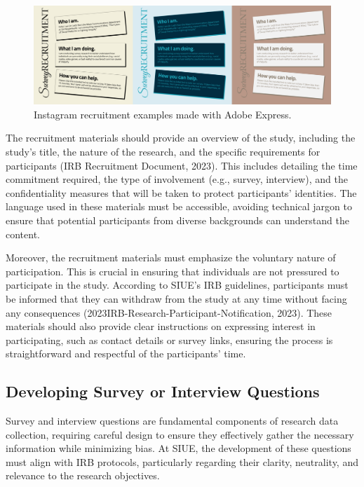 \documentclass[
]{book}
\begin{document}
\begin{figure}
\centering
\includegraphics[width=1\textwidth,height=\textheight]{images/recruit-ad.png}
\caption{Instagram recruitment examples made with Adobe Express.}
\end{figure}

The recruitment materials should provide an overview of the study, including the study's title, the nature of the research, and the specific requirements for participants (IRB Recruitment Document, 2023). This includes detailing the time commitment required, the type of involvement (e.g., survey, interview), and the confidentiality measures that will be taken to protect participants' identities. The language used in these materials must be accessible, avoiding technical jargon to ensure that potential participants from diverse backgrounds can understand the content.

Moreover, the recruitment materials must emphasize the voluntary nature of participation. This is crucial in ensuring that individuals are not pressured to participate in the study. According to SIUE's IRB guidelines, participants must be informed that they can withdraw from the study at any time without facing any consequences (2023IRB-Research-Participant-Notification, 2023). These materials should also provide clear instructions on expressing interest in participating, such as contact details or survey links, ensuring the process is straightforward and respectful of the participants' time.

\subsection*{Developing Survey or Interview Questions}\label{developing-survey-or-interview-questions}

Survey and interview questions are fundamental components of research data collection, requiring careful design to ensure they effectively gather the necessary information while minimizing bias. At SIUE, the development of these questions must align with IRB protocols, particularly regarding their clarity, neutrality, and relevance to the research objectives.
\end{document}
